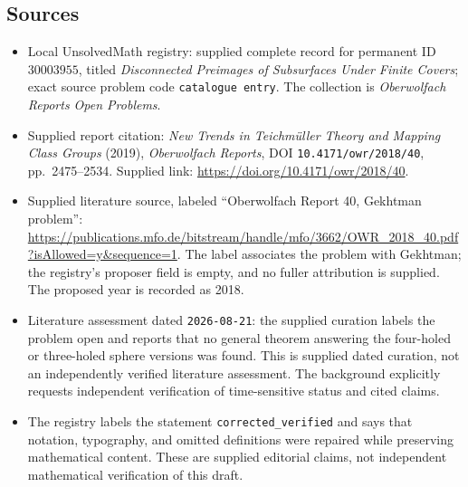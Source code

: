 \documentclass[11pt]{article}
\begin{document}
\subsection{Sources}
\begin{itemize}
\item Local UnsolvedMath registry: supplied complete record for permanent ID \(30003955\), titled \emph{Disconnected Preimages of Subsurfaces Under Finite Covers}; exact source problem code \texttt{catalogue entry}. The collection is \emph{Oberwolfach Reports Open Problems}.
\item Supplied report citation: \emph{New Trends in Teichmüller Theory and Mapping Class Groups} (2019), \emph{Oberwolfach Reports}, DOI \texttt{10.4171/owr/2018/40}, pp.\ 2475--2534. Supplied link: \url{https://doi.org/10.4171/owr/2018/40}.
\item Supplied literature source, labeled ``Oberwolfach Report 40, Gekhtman problem'': \url{https://publications.mfo.de/bitstream/handle/mfo/3662/OWR_2018_40.pdf?isAllowed=y&sequence=1}. The label associates the problem with Gekhtman; the registry's proposer field is empty, and no fuller attribution is supplied. The proposed year is recorded as 2018.
\item Literature assessment dated \texttt{2026-08-21}: the supplied curation labels the problem open and reports that no general theorem answering the four-holed or three-holed sphere versions was found. This is supplied dated curation, not an independently verified literature assessment. The background explicitly requests independent verification of time-sensitive status and cited claims.
\item The registry labels the statement \texttt{corrected\_verified} and says that notation, typography, and omitted definitions were repaired while preserving mathematical content. These are supplied editorial claims, not independent mathematical verification of this draft.
\end{itemize}
\end{document}
